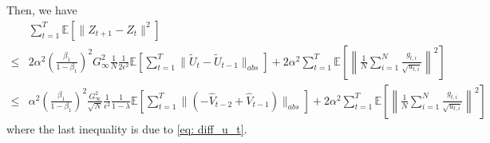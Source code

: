 \documentclass{article} %
\begin{document}
Then, we have
\begin{align}
& \sum_{t=1}^T \mathbb E [\| Z_{t+1}-  Z_{t}\|^2]  \nonumber \\
\leq & 2 \alpha^2 \left ( \frac{\beta_1}{1-\beta_1} \right)^2    G_{\infty} ^2 \frac{1}{N}   \frac{1}{{2\epsilon^2}}  \mathbb E \left [\sum_{t=1}^T    \|\tilde U_t - \tilde U_{t-1} \|_{abs} \right] +  2 \alpha^2  \sum_{t=1}^T   \mathbb E \left[ \left\| \frac{1}{N} \sum_{i=1}^N \frac{g_{t,i}}{\sqrt{u_{t,i}}} \right\|^2 \right]\nonumber \\
\leq &  \alpha^2 \left ( \frac{\beta_1}{1-\beta_1} \right)^2   \frac{ G_{\infty} ^2 }{\sqrt{N}}   \frac{1}{{\epsilon^2}} \frac{1}{1-\lambda}  \mathbb E \left [ \sum_{t=1}^T  \| ( - \hat V_{t-2} + \hat V_{t-1}) \|_{abs}\right] + 2 \alpha^2 \sum_{t=1}^T  \mathbb E\left[ \left\| \frac{1}{N} \sum_{i=1}^N \frac{g_{t,i}}{\sqrt{u_{t,i}}} \right\|^2 \right]
\end{align}
where the last inequality is due to \eqref{eq: diff_u_t}.
\end{document}
